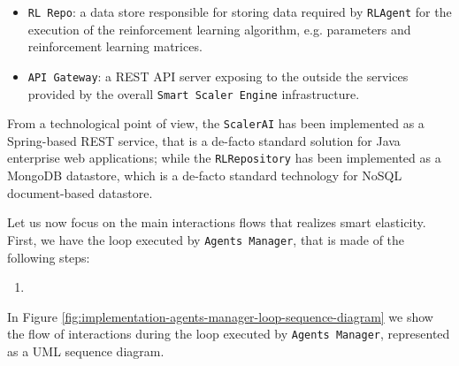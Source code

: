 \begin{itemize}
\begin{itemize}
		\item \texttt{RL Repo}: a data store responsible for storing data required by \texttt{RLAgent} for the execution of the reinforcement learning algorithm, e.g. parameters and reinforcement learning matrices.
		
		\item \texttt{API Gateway}: a REST API server exposing to the outside the services provided by the overall \texttt{Smart Scaler Engine} infrastructure.
		
	\end{itemize}
	
\end{itemize}

From a technological point of view, the \texttt{ScalerAI} has been implemented as a Spring-based REST service, that is a de-facto standard solution for Java enterprise web applications; while the \texttt{RLRepository} has been implemented as a MongoDB datastore, which is a de-facto standard technology for NoSQL document-based datastore. 

Let us now focus on the main interactions flows that realizes smart elasticity.
%
First, we have the loop executed by \texttt{Agents Manager}, that is made of the following steps:
%
\begin{enumerate}
	\item 
\end{enumerate}
%
In Figure \ref{fig:implementation-agents-manager-loop-sequence-diagram} we show the flow of interactions during the loop executed by \texttt{Agents Manager}, represented as a UML sequence diagram.

